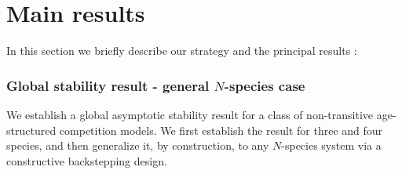 \documentclass[10pt, a4paper]{amsart}
\theoremstyle{plain}
\theoremstyle{definition}
\theoremstyle{remark}
\numberwithin{equation}{section}
\begin{document}


\section*{\bf Main results}
In this section we briefly describe our strategy and the principal results : 
\subsubsection*{\bf Global stability result - general $N$-species case}
We establish a global asymptotic stability result for a class of non-transitive age-structured competition models. We first establish the result for three and four species, and then generalize it, by construction, to any $N$-species system via a constructive backstepping design.
\end{document}
